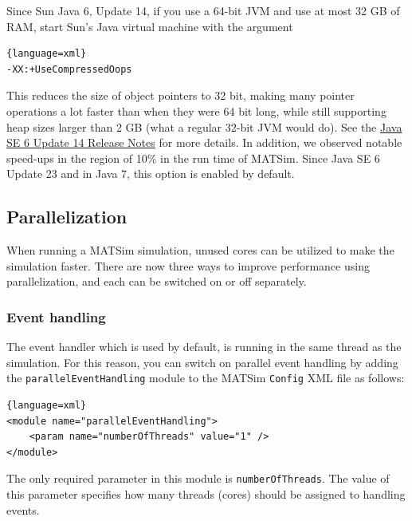 Since Sun Java 6, Update 14, if you use a 64-bit JVM and use at most 32 GB of RAM, start Sun's Java virtual machine with the argument 
\begin{lstlisting}{language=xml}
-XX:+UseCompressedOops
\end{lstlisting}
This reduces the size of object pointers to 32 bit, making many pointer operations a lot faster than when they were 64 bit long, while still supporting heap sizes larger than 2 GB (what a regular 32-bit JVM would do). See the \href{http://www.oracle.com/technetwork/java/javase/6u14-137039.html}{Java SE 6 Update 14 Release Notes} for more details. In addition, we observed notable speed-ups in the region of 10\% in the run time of MATSim. Since Java SE 6 Update 23 and in Java 7, this option is enabled by default.

\subsection{Parallelization}
When running a MATSim simulation, unused cores can be utilized to make the simulation faster. There are now three ways to improve performance using parallelization, and each can be switched on or off separately.

\subsubsection{Event handling}\label{sec:ParallelEventsHandling}
The event handler which is used by default, is running in the same thread as the simulation. For this reason, you can switch on parallel event handling by adding the \texttt{parallelEventHandling} module to the MATSim \texttt{Config} XML file as follows:
\begin{lstlisting}{language=xml}
<module name="parallelEventHandling">
    <param name="numberOfThreads" value="1" />
</module>
\end{lstlisting}
The only required parameter in this module is \texttt{numberOfThreads}. The value of this parameter specifies how many threads (cores) should be assigned to handling events.

